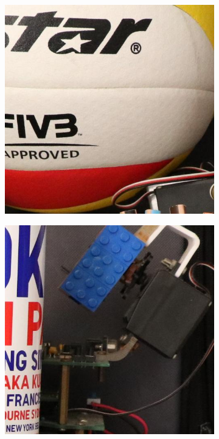 \begin{figure}
\begin{subfigure}[t]{0.19\textwidth}
    \end{subfigure}
    \hfill
    \begin{subfigure}[t]{0.19\textwidth}
        \centering
        \includegraphics[width=1\textwidth]{images/guided/Canon_80D_ISO3200_IMG_9133_part4.JPG}
    \end{subfigure}
    \hfill
    \begin{subfigure}[t]{0.19\textwidth}
        \centering
        \includegraphics[width=1\textwidth]{images/guided/Canon_80D_ISO3200_IMG_9333_part6.JPG}

\end{subfigure}
\end{figure}
